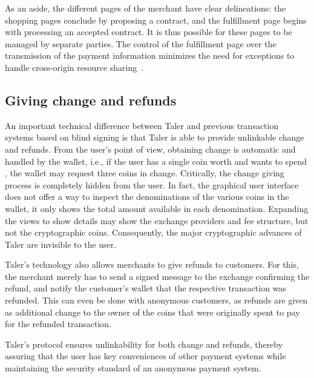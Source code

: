 \documentclass{llncs}
\begin{document}
As an aside, the different pages of the merchant have clear
delineations: the shopping pages conclude by proposing a contract, and
the fulfillment page begins with processing an accepted contract.  It is thus
possible for these pages to be managed by separate parties. The
control of the fulfillment page over the transmission of the payment
information minimizes the need for exceptions to handle cross-origin
resource sharing~\cite{rfc6454,cors}.


\subsection{Giving change and refunds} %

An important technical difference between Taler and previous
transaction systems based on blind signing is that Taler is able to
provide unlinkable change and refunds.  From the user's point of view,
obtaining change is automatic and handled by the wallet, i.e., if the
user has a single coin worth  and wants to spend , the
wallet may request three  coins in change. Critically, the
change giving process is completely hidden from the user.
In fact, the graphical user
interface does not offer a way to inspect the denominations of the
various coins in the wallet, it only shows the total amount available
in each denomination.  Expanding the views to show details may show
the exchange providers and fee structure, but not the cryptographic
coins.  Consequently, the major cryptographic advances of Taler are
invisible to the user.

Taler's technology also allows merchants to give refunds to
customers. For this, the merchant merely has to send a signed
message to the exchange confirming the refund, and notify the
customer's wallet that the respective transaction was refunded.
This can even be done with anonymous customers, as refunds are
given as additional change to the owner of the coins that were
originally spent to pay for the refunded transaction.

Taler's protocol ensures unlinkability for both change and refunds,
thereby assuring that the user has key conveniences of other payment
systems while maintaining the security standard of an anonymous
payment system.
\end{document}

